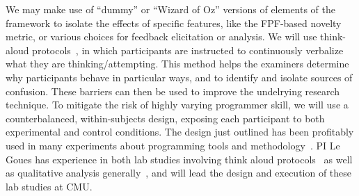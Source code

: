 We may make use of ``dummy'' or ``Wizard of Oz'' versions of elements of the
framework to isolate the effects of specific features, like the FPF-based
novelty metric, or various choices for feedback elicitation or analysis.
We will use
think-aloud protocols~\cite{thinkaloud}, in which participants are instructed to
continuously verbalize what they are thinking/attempting. This method helps the
examiners determine why participants behave in particular ways, and to identify
and isolate sources of confusion.  These barriers can then be used to improve
the undelrying research technique.  To mitigate the risk of highly varying
programmer skill, we will use a counterbalanced, within-subjects design,
exposing each participant to both experimental and control conditions.  The
design just outlined has been profitably used in many
experiments about programming tools and
methodology~\cite{Endrikat2014,Stylos07}.  PI Le Goues has experience in both
lab studies involving think aloud protocols~\cite{frameworkDebugging} as well as
qualitative analysis generally~\cite{testingUnderReview}, and will lead the
design and execution of these lab studies at CMU.

